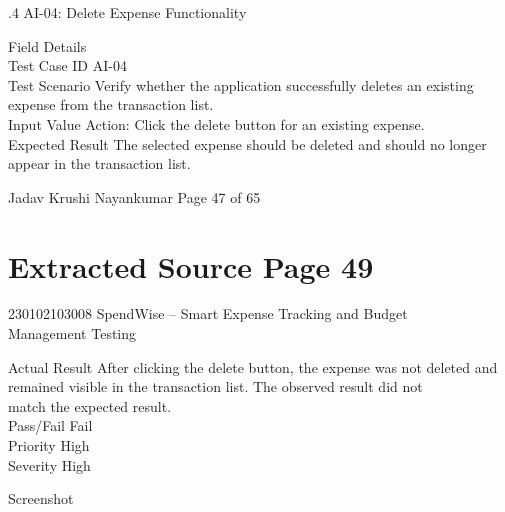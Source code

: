\documentclass[12pt,a4paper]{report}
\begin{document}
\smallskip

.4 AI-04: Delete Expense Functionality\\ 

\smallskip

\smallskip
Field                    Details\\ 
Test Case ID             AI-04\\ 
Test Scenario            Verify whether the application successfully deletes an existing\\ 
expense from the transaction list.\\ 
Input Value              Action: Click the delete button for an existing expense.\\ 
Expected Result          The selected expense should be deleted and should no longer\\ 
appear in the transaction list.\\ 

\smallskip

\smallskip

\smallskip

\smallskip
Jadav Krushi Nayankumar                                                         Page 47 of 65\\ 

\clearpage
\section*{Extracted Source Page 49}
230102103008                          SpendWise – Smart Expense Tracking and Budget\\ 
Management Testing\\ 

\smallskip

\smallskip
Actual Result             After clicking the delete button, the expense was not deleted and\\ 
remained visible in the transaction list. The observed result did not\\ 
match the expected result.\\ 
Pass/Fail                 Fail\\ 
Priority                  High\\ 
Severity                  High\\ 

\smallskip

\smallskip
Screenshot\\ 

\smallskip
\end{document}
